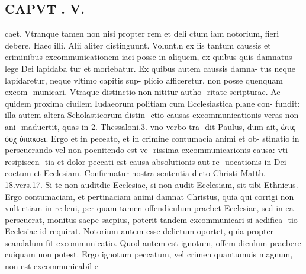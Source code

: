 \documentclass{article}
\begin{document}
\begin{pages}
\section*{CAPVT . V. }\pstart caet. Vtranque tamen non nisi propter rem et deli ctum iam notorium, fieri debere. Haec illi. Alii aliter distinguunt. Volunt.n ex iis tantum caussis et criminibus excommunicationem iaci posse in aliquem, ex quibus quis damnatus lege Dei lapidaba tur et moriebatur. Ex quibus autem caussis damna- tus neque lapidaretur, neque vltimo capitis sup- plicio afficeretur, non posse quenquam excom- municari. Vtraque distinctio non nititur autho- ritate scripturae. Ac quidem proxima ciuilem Iudaeorum politiam cum Ecclesiastica plane con- fundit: illa autem altera Scholasticorum distin- ctio causas excommunicationis veras non ani- maduertit, quas in 2. Thessaloni.3. vno verbo tra- dit Paulus, dum ait, ὠτις ὀυχ ὐπακόει. Ergo et in peceato, et in crimine contumacia animi et ob- stinatio in perseuerando vel non poenitendo est ve- rissima excommunicarionis causa: vti resipiscen- tia et dolor peccati est causa absolutionis aut re- uocationis in Dei coetum et Ecclesiam. Confirmatur nostra sententia dicto Christi Matth. 18.vers.17. Si te non auditdic Ecclesiae, si non audit Ecclesiam, sit tibi Ethnicus. Ergo contumaciam, et pertinaciam animi damnat Christus, quia qui corrigi non vult etiam in re leui, per quam tamen offendiculum praebet Ecclesiae, sed in ea perseuerat, monitus saepe saepius, poterit tandem excommunicari si aedifica- tio Ecclesiae id requirat. Notorium autem esse delictum oportet, quia propter scandalum fit excommunicatio. Quod autem est ignotum, offem diculum praebere cuiquam non potest. Ergo ignotum peccatum, vel crimen quantumuis magnum, non est excommunicabil e-  \pend

\end{pages}
\end{document}
